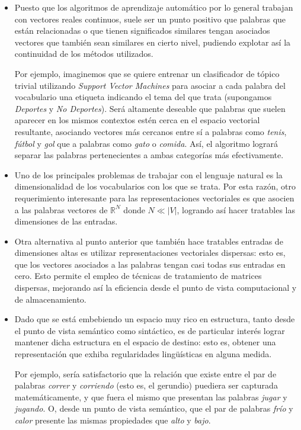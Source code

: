 \begin{itemize}

\item Puesto que los algoritmos de aprendizaje automático por lo general trabajan con vectores
reales continuos, suele ser un punto positivo que palabras que están relacionadas o que tienen
significados similares tengan asociados vectores que también sean similares en cierto nivel,
pudiendo explotar así la continuidad de los métodos utilizados.

Por ejemplo, imaginemos que se quiere entrenar un clasificador de tópico trivial utilizando
\textit{Support Vector Machines} para asociar a cada palabra del vocabulario una etiqueta indicando
el tema del que trata (supongamos \textit{Deportes} y \textit{No Deportes}). Será altamente deseable
que palabras que suelen aparecer en los mismos contextos estén cerca en el espacio vectorial
resultante, asociando vectores más cercanos entre sí a palabras como \textit{tenis}, \textit{fútbol}
y \textit{gol} que a palabras como \textit{gato} o \textit{comida}. Así, el algoritmo logrará
separar las palabras pertenecientes a ambas categorías más efectivamente.

\item Uno de los principales problemas de trabajar con el lenguaje natural es la dimensionalidad de
los vocabularios con los que se trata. Por esta razón, otro requerimiento interesante para las
representaciones vectoriales es que asocien a las palabras vectores de $\mathbb{R}^N$ donde $N \ll
|V|$, logrando así hacer tratables las dimensiones de las entradas.

\item Otra alternativa al punto anterior que también hace tratables entradas de dimensiones altas es
utilizar representaciones vectoriales dispersas: esto es, que los vectores asociados a las palabras
tengan casi todas sus entradas en cero. Esto permite el empleo de técnicas de tratamiento de
matrices dispersas, mejorando así la eficiencia desde el punto de vista computacional y de
almacenamiento.

\item Dado que se está embebiendo un espacio muy rico en estructura, tanto desde el punto de vista
semántico como sintáctico, es de particular interés lograr mantener dicha estructura en el espacio
de destino: esto es, obtener una representación que exhiba regularidades lingüísticas en alguna
medida.

Por ejemplo, sería satisfactorio que la relación que existe entre el par de palabras \textit{correr}
y \textit{corriendo} (esto es, el gerundio) puediera ser capturada matemáticamente, y que fuera el
mismo que presentan las palabras \textit{jugar} y \textit{jugando}. O, desde un punto de vista
semántico, que el par de palabras \textit{frío} y \textit{calor} presente las mismas propiedades que
\textit{alto} y \textit{bajo}.

\end{itemize}


